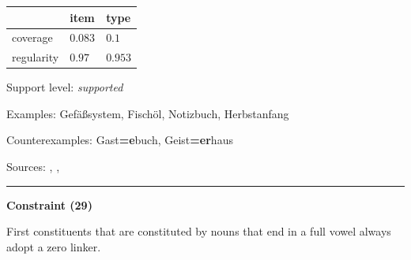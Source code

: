 \vspace{-0.25em}

\begin{table}[!ht]
\begin{center}
\setlength{\extrarowheight}{1pt}
\begin{tabularx}{\columnwidth}{|X|X|X|}
\hline
 & item & type \\
\hline
 coverage & $0.083$ & $0.1$ \\
\hline
 regularity & $0.97$ & $0.953$ \\
\hline
\end{tabularx}
\end{center}
\end{table}

\vspace{-1.35em}

\noindent
Support level: \textit{supported}

\vspace{0.3em}

\noindent
Examples: Gefäß{\zeroLinker}system, Fisch{\zeroLinker}öl, Notiz{\zeroLinker}buch, Herbst{\zeroLinker}anfang

\noindent
Counterexamples: Gast\textbf{=e}buch, Geist\textbf{=er}haus

\vspace{0.3em}

\noindent
Sources: \citet[19]{kuerschner_2010}, \citet[89, 109]{ortner_mueller-bollhagen_1991}, \citet[181]{wegener_2005}

\vspace{0.35em}
\hrule




\vspace{0.4em}

\begin{center}
\textbf{Constraint (29)}
\end{center}

\noindent
First constituents that are constituted by nouns that end in a full vowel always adopt a zero linker.
\vspace{0.5em}


